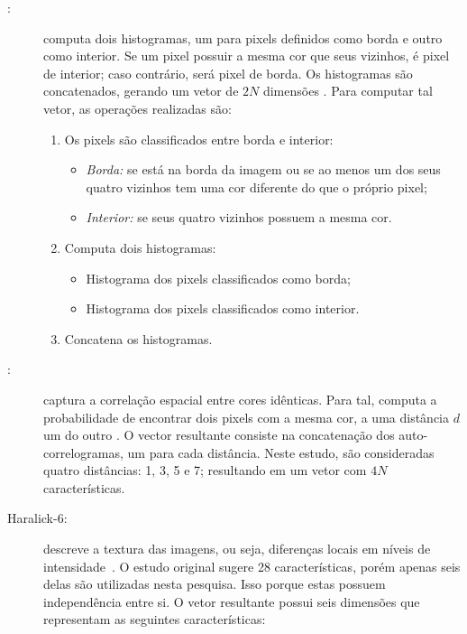 \begin{description}
\item[:] computa dois histogramas, um para pixels definidos como borda e outro como interior. Se um pixel possuir a mesma cor que seus vizinhos, é pixel de interior; caso contrário, será pixel de borda. Os histogramas são concatenados, gerando um vetor de $2N$ dimensões \cite{bic}. Para computar tal vetor, as operações realizadas são:

\begin{enumerate}
  \item Os pixels são classificados entre borda e interior:
  \begin{itemize}
    \item \emph{Borda:} se está na borda da imagem ou se ao menos um dos seus quatro vizinhos tem uma cor diferente do que o próprio pixel;
    \item \emph{Interior:} se seus quatro vizinhos possuem a mesma cor.
  \end{itemize}
  \item Computa dois histogramas:
  \begin{itemize}
    \item Histograma dos pixels classificados como borda;
    \item Histograma dos pixels classificados como interior.
  \end{itemize}
  \item Concatena os histogramas.
\end{enumerate}

\item[:] captura a correlação espacial entre cores idênticas. Para tal, computa a probabilidade de encontrar dois pixels com a mesma cor, a uma distância $d$ um do outro \cite{acc}. O vector resultante consiste na concatenação dos auto-correlogramas, um para cada distância. Neste estudo, são consideradas quatro distâncias: 1, 3, 5 e 7; resultando em um vetor com $4N$ características.

\item[Haralick-6:] descreve a textura das imagens, ou seja, diferenças locais em níveis de intensidade~\cite{Haralick1973}. O estudo original sugere 28 características, porém apenas seis delas são utilizadas nesta pesquisa. Isso porque estas possuem independência entre si. O vetor resultante possui seis dimensões que representam as seguintes características:


\end{description}
